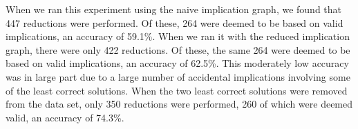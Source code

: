 \documentclass[11pt,twoside]{article}
\theoremstyle{definition}
\begin{document}

When we ran this experiment using the naive implication graph, we found that 447 reductions were performed. Of these, 264 were deemed to be based on valid implications, an accuracy of 59.1\%. When we ran it with the reduced implication graph, there were only 422 reductions. Of these, the same 264 were deemed to be based on valid implications, an accuracy of 62.5\%. This moderately low accuracy was in large part due to a large number of accidental implications involving some of the least correct solutions. When the two least correct solutions were removed from the data set, only 350 reductions were performed, 260 of which were deemed valid, an accuracy of 74.3\%.

\end{document}
